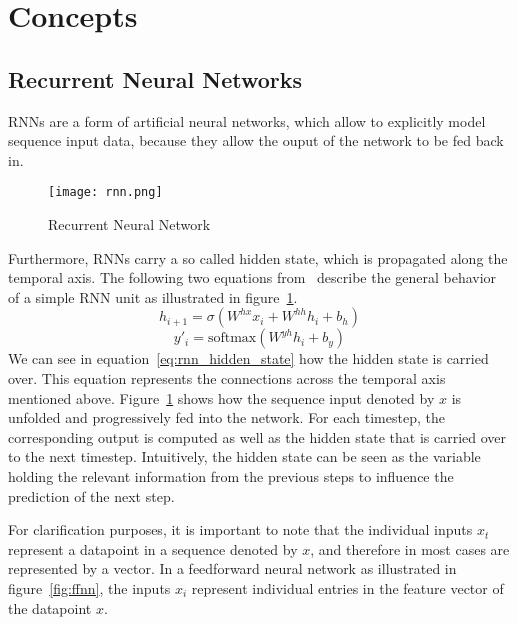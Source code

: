\section{Concepts}
\subsection{Recurrent Neural Networks}\label{rnn}
RNNs are a form of artificial neural networks, which allow to explicitly model sequence input data, because they allow the ouput of the network to be fed back in.
\begin{figure}[t]
	\centering
	\captionsetup{width=0.8\textwidth}
    \texttt{[image: rnn.png]}
    \caption{Recurrent Neural Network}
    \label{fig:rnn}
\end{figure}
Furthermore, RNNs carry a so called hidden state, which is propagated along the temporal axis.
The following two equations from~\cite{rnn_survey} describe the general behavior of a simple RNN unit as illustrated in figure~\ref{fig:rnn}.
\begin{equation}\label{eq:rnn_hidden_state}
    h_{i+1} = \sigma(W^{hx}x_i + W^{hh}h_i + b_h)
\end{equation}
\begin{equation}\label{eq:rnn_output}
    y'_i = \text{softmax}(W^{yh}h_i + b_y)
\end{equation}
We can see in equation~\ref{eq:rnn_hidden_state} how the hidden state is carried over.
This equation represents the connections across the temporal axis mentioned above.
Figure~\ref{fig:rnn} shows how the sequence input denoted by $x$ is unfolded and progressively fed into the network.
For each timestep, the corresponding output is computed as well as the hidden state that is carried over to the next timestep.
Intuitively, the hidden state can be seen as the variable holding the relevant information from the previous steps to influence the prediction of the next step.
\par
For clarification purposes, it is important to note that the individual inputs $x_t$ represent a datapoint in a sequence denoted by $x$, and therefore in most cases are represented by a vector.
In a feedforward neural network as illustrated in figure~\ref{fig:ffnn}, the inputs $x_i$ represent individual entries in the feature vector of the datapoint $x$.
